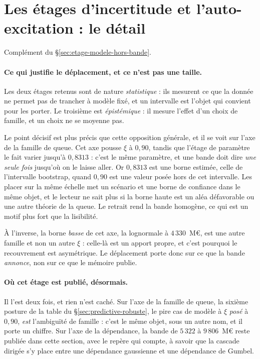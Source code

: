 \section{Les étages d'incertitude et l'auto-excitation : le détail}
\label{sec:ann-etages-hawkes}


Complément du \S\ref{sec:etage-modele-hors-bande}.

\paragraph{Ce qui justifie le déplacement, et ce n'est pas une taille.} Les deux étages retenus
sont de nature \emph{statistique} : ils mesurent ce que la donnée ne permet pas de trancher à
modèle fixé, et un intervalle est l'objet qui convient pour les porter. Le troisième est
\emph{épistémique} : il mesure l'effet d'un choix de famille, et un choix ne se moyenne pas.

Le point décisif est plus précis que cette opposition générale, et il se voit sur l'axe de la
famille de queue. Cet axe pousse $\xi$ à $0{,}90$, tandis que l'étage de paramètre le fait varier
jusqu'à $0{,}8313$ : c'est le même paramètre, et une bande doit dire \emph{une seule
fois} jusqu'où on le laisse aller. Or $0{,}8313$ est une borne estimée, celle de
l'intervalle bootstrap, quand $0{,}90$ est une valeur posée hors de cet intervalle. Les
placer sur la même échelle met un scénario et une borne de confiance dans le même objet, et le
lecteur ne sait plus si la borne haute est un aléa défavorable ou une autre théorie de la queue.
Le retrait rend la bande homogène, ce qui est un motif plus fort que la lisibilité.

À l'inverse, la borne \emph{basse} de cet axe, la lognormale à $4\,330$~M\euro, est une autre
famille et non un autre $\xi$ : celle-là est un apport propre, et c'est pourquoi le
recouvrement est asymétrique. Le déplacement porte donc sur ce que la bande \emph{annonce},
non sur ce que le mémoire publie.

\paragraph{Où cet étage est publié, désormais.} Il l'est deux fois, et rien n'est caché. Sur
l'axe de la famille de queue, la sixième posture de la table du
\S\ref{sec:predictive-robuste}, le pire cas de modèle à $\xi$ \emph{posé} à $0{,}90$, \emph{est}
l'ambiguïté de famille : c'est le même objet, sous un autre nom, et il porte un chiffre.
Sur l'axe de la dépendance, la bande de $5\,322$ à $9\,806$~M\euro{} reste publiée dans cette
section, avec le repère qui compte, à savoir que la cascade dirigée s'y place entre une
dépendance gaussienne et une dépendance de Gumbel.

